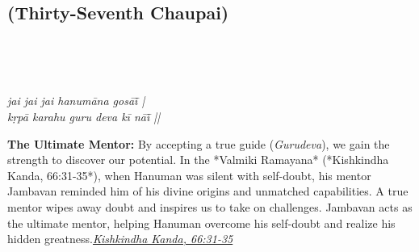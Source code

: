 
\newpage

\subsection*{ (Thirty-Seventh Chaupai)}

\begin{minipage}[t]{0.55\textwidth}
\vspace{0pt}

{\large \linespread{1.5}\selectfont
{}\\
\par}

\vspace{0.5em}

{\large \linespread{1.5}\selectfont
{}\\
\par}

\vspace{0.5em}

{\large \linespread{1.3}\selectfont
\textit{jai jai jai hanumāna gosāī̃ |}\\
\textit{kṛpā karahu guru deva kī nāī̃ ||}
\par}
\end{minipage}%
\hfill
\begin{minipage}[t]{0.42\textwidth}
\vspace{0pt}
\begin{tcolorbox}[anchorbox]
\textbf{The Ultimate Mentor:} By accepting a true guide (\textit{Gurudeva}), we gain the strength to discover our potential. In the *Valmiki Ramayana* (*Kishkindha Kanda, 66:31-35*), when Hanuman was silent with self-doubt, his mentor Jambavan reminded him of his divine origins and unmatched capabilities. A true mentor wipes away doubt and inspires us to take on challenges.
\vspace{0.5em}\newline Jambavan acts as the ultimate mentor, helping Hanuman overcome his self-doubt and realize his hidden greatness.\newline\null\hfill\href{https://www.valmiki.iitk.ac.in/sloka?field_kanda_tid=4&language=dv&field_sarga_value=66}{\textit{Kishkindha Kanda, 66:31-35}}
\end{tcolorbox}
\end{minipage}

